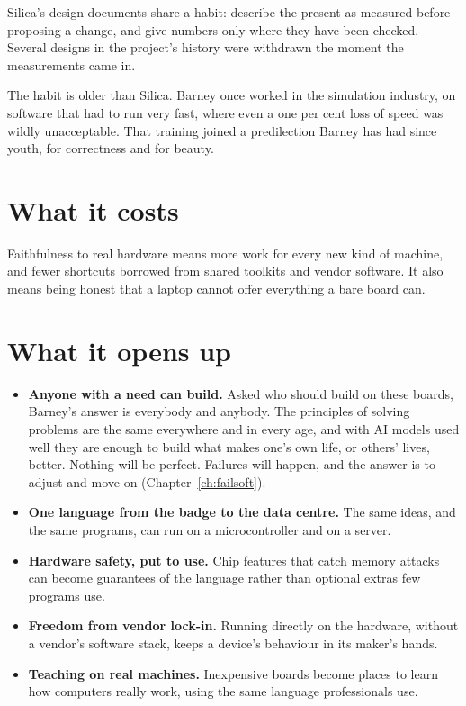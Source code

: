 Silica's design documents share a habit: describe the present as measured
before proposing a change, and give numbers only where they have been checked.
Several designs in the project's history were withdrawn the moment the
measurements came in.

The habit is older than Silica. Barney once worked in the simulation industry,
on software that had to run very fast, where even a one per cent loss of speed
was wildly unacceptable. That training joined a predilection Barney has had
since youth, for correctness and for beauty.

\section{What it costs}

Faithfulness to real hardware means more work for every new kind of machine,
and fewer shortcuts borrowed from shared toolkits and vendor software. It also
means being honest that a laptop cannot offer everything a bare board can.

\section{What it opens up}

\begin{itemize}
  \item \textbf{Anyone with a need can build.} Asked who should build on
        these boards, Barney's answer is everybody and anybody. The principles
        of solving problems are the same everywhere and in every age, and with
        AI models used well they are enough to build what makes one's own life,
        or others' lives, better. Nothing will be perfect. Failures will happen,
        and the answer is to adjust and move on (Chapter~\ref{ch:failsoft}).
  \item \textbf{One language from the badge to the data centre.} The same
        ideas, and the same programs, can run on a microcontroller and on a
        server.
  \item \textbf{Hardware safety, put to use.} Chip features that catch memory
        attacks can become guarantees of the language rather than optional
        extras few programs use.
  \item \textbf{Freedom from vendor lock-in.} Running directly on the
        hardware, without a vendor's software stack, keeps a device's
        behaviour in its maker's hands.
  \item \textbf{Teaching on real machines.} Inexpensive boards become places
        to learn how computers really work, using the same language
        professionals use.
\end{itemize}


